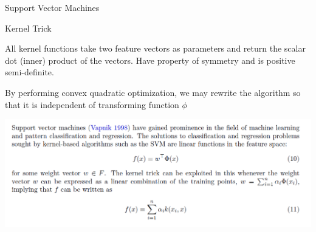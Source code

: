 \documentclass[ignorenonframetext,]{beamer}
\begin{document}
\begin{frame}{Support Vector Machines}

\begin{block}{Kernel Trick}

All kernel functions take two feature vectors as parameters and return
the scalar dot (inner) product of the vectors. Have property of symmetry
and is positive semi-definite.

By performing convex quadratic optimization, we may rewrite the
algorithm so that it is independent of transforming function \(\phi\)

\includegraphics[width=800px]{svm7}

\end{block}

\end{frame}
\end{document}
